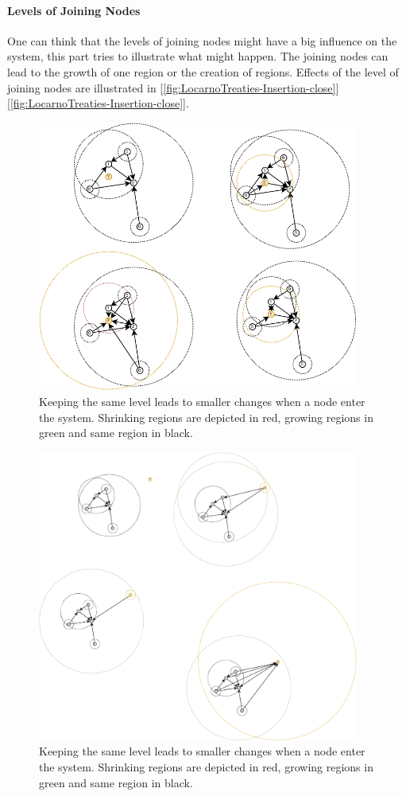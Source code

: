 \documentclass[a4paper,11pt,oneside]{report}
\begin{document}
\paragraph{Levels of Joining Nodes}
One can think that the levels of joining nodes might have a big influence on the
system, this part tries to illustrate what might happen. The joining nodes can
lead to the growth of one region or the creation
of regions. Effects of the level of joining nodes are illustrated in [\autoref{fig:LocarnoTreaties-Insertion-close}][\autoref{fig:LocarnoTreaties-Insertion-close}].

\begin{figure}[!h] 
\centering
\includegraphics[width=300pt]{figures/LocarnoTreaties-Insertion-close}
\caption{Keeping the same level leads to smaller changes when a node enter the
  system. Shrinking regions are depicted in red, growing regions in green and
  same region in black.} \label{fig:LocarnoTreaties-Insertion-close}
\end{figure}

\begin{figure}[!h] 
\centering
\includegraphics[width=300pt]{figures/LocarnoTreaties-Insertion-far}
\caption{Keeping the same level leads to smaller changes when a node enter the
  system. Shrinking regions are depicted in red, growing regions in green and
  same region in black.} \label{fig:LocarnoTreaties-Insertion-far}
\end{figure}
\end{document}
